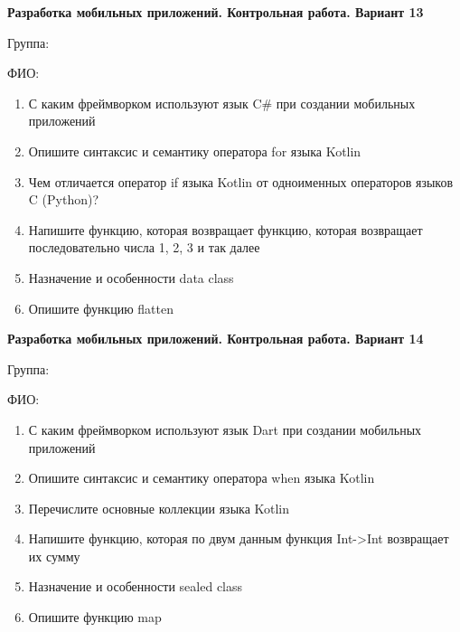 \documentclass[12pt]{article}
\begin{document}
\newpage\begin{minipage}{\textwidth}
\textbf{Разработка мобильных приложений. Контрольная работа. Вариант 13}

Группа: \underline{\hspace{3cm}}

ФИО: \underline{\hspace{10cm}}

\begin{enumerate}
\item С каким фреймворком используют язык C\# при создании мобильных приложений
\item Опишите синтаксис и семантику оператора for языка Kotlin
\item Чем отличается оператор if языка Kotlin от одноименных операторов языков C (Python)?
\item Напишите функцию, которая возвращает функцию, которая возвращает последовательно числа 1, 2, 3 и так далее
\item Назначение и особенности data class
\item Опишите функцию flatten

\end{enumerate}
\end{minipage}

\newpage\begin{minipage}{\textwidth}
\textbf{Разработка мобильных приложений. Контрольная работа. Вариант 14}

Группа: \underline{\hspace{3cm}}

ФИО: \underline{\hspace{10cm}}

\begin{enumerate}
\item С каким фреймворком используют язык Dart при создании мобильных приложений
\item Опишите синтаксис и семантику оператора when языка Kotlin
\item Перечислите основные коллекции языка Kotlin
\item Напишите функцию, которая по двум данным функция Int->Int возвращает их сумму
\item Назначение и особенности sealed class
\item Опишите функцию map

\end{enumerate}
\end{minipage}
\end{document}
